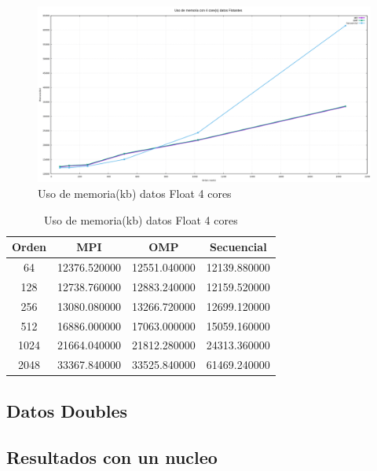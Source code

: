\documentclass[10pt]{IEEEtran}
\begin{document}
\begin{figure}[H]
  \centering
  \includegraphics[width=0.95\linewidth]{figs/4nucleosFlotantesMemoria.png}
  \caption{Uso de memoria(kb) datos Float 4 cores}
  \label{fig:f2}
\end{figure}

\begin{table}[H]
  \caption{Uso de memoria(kb) datos Float 4 cores}
  \label{table_example}
  \centering
  \begin{tabular}{|c|c|c|c|}
    \hline
    \textbf{Orden} & \textbf{MPI} & \textbf{OMP} & \textbf{Secuencial} \\
    \hline
    64 & 12376.520000 & 12551.040000 & 12139.880000 \\
    128 & 12738.760000 & 12883.240000 & 12159.520000 \\
    256 & 13080.080000 & 13266.720000 & 12699.120000 \\
    512 & 16886.000000 & 17063.000000 & 15059.160000 \\
    1024 & 21664.040000 & 21812.280000 & 24313.360000 \\
    2048 & 33367.840000 & 33525.840000 & 61469.240000 \\
    \hline
  \end{tabular}
\end{table}

\subsection{Datos Doubles}

\subsection{Resultados con un nucleo}
\end{document}
